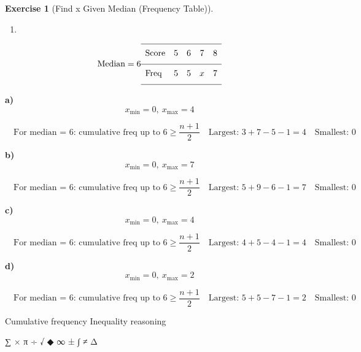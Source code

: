\documentclass[
  letterpaper,
  DIV=11,
  numbers=noendperiod]{scrreprt}
\providecommand{\tightlist}{%
  \setlength{\itemsep}{0pt}\setlength{\parskip}{0pt}}
\theoremstyle{definition}
\newtheorem{exercise}{Exercise}[chapter]
\theoremstyle{remark}
\begin{document}
\begin{exercise}[Find x Given Median (Frequency
Table)]
\begin{enumerate}
\def\labelenumi{\alph{enumi})}
\setcounter{enumi}{3}
\tightlist
\item
\end{enumerate}

\[\text{Median} = 6\\[6pt]{\renewcommand{\arraystretch}{1.6}\begin{array}{lcccc}
\hline \text{Score} & 5 & 6 & 7 & 8 \\[4pt]
\hline \text{Freq} & 5 & 5 & x & 7 \\[4pt]
\hline
\end{array}}\]

\begin{tcolorbox}[enhanced jigsaw, opacitybacktitle=0.6, coltitle=black, arc=.35mm, colframe=quarto-callout-tip-color-frame, colback=white, bottomrule=.15mm, left=2mm, colbacktitle=quarto-callout-tip-color!10!white, titlerule=0mm, opacityback=0, title=\textcolor{quarto-callout-tip-color}{\faLightbulb}\hspace{0.5em}{🔍 View Solution}, leftrule=.75mm, breakable, rightrule=.15mm, bottomtitle=1mm, toptitle=1mm, toprule=.15mm]

\textbf{a)} \[x_{\min} = 0,\ x_{\max} = 4\]

\[\quad \text{For median = 6: cumulative freq up to 6} \geq \frac{n+1}{2}\quad \text{Largest: }3+7-5-1=4\quad \text{Smallest: }0\]

\textbf{b)} \[x_{\min} = 0,\ x_{\max} = 7\]

\[\quad \text{For median = 6: cumulative freq up to 6} \geq \frac{n+1}{2}\quad \text{Largest: }5+9-6-1=7\quad \text{Smallest: }0\]

\textbf{c)} \[x_{\min} = 0,\ x_{\max} = 4\]

\[\quad \text{For median = 6: cumulative freq up to 6} \geq \frac{n+1}{2}\quad \text{Largest: }4+5-4-1=4\quad \text{Smallest: }0\]

\textbf{d)} \[x_{\min} = 0,\ x_{\max} = 2\]

\[\quad \text{For median = 6: cumulative freq up to 6} \geq \frac{n+1}{2}\quad \text{Largest: }5+5-7-1=2\quad \text{Smallest: }0\]

\end{tcolorbox}

{Cumulative frequency} {Inequality reasoning}

\end{exercise}

∑ × π ÷ √ ◆ ∞ ± ∫ ≠ Δ
\end{document}
